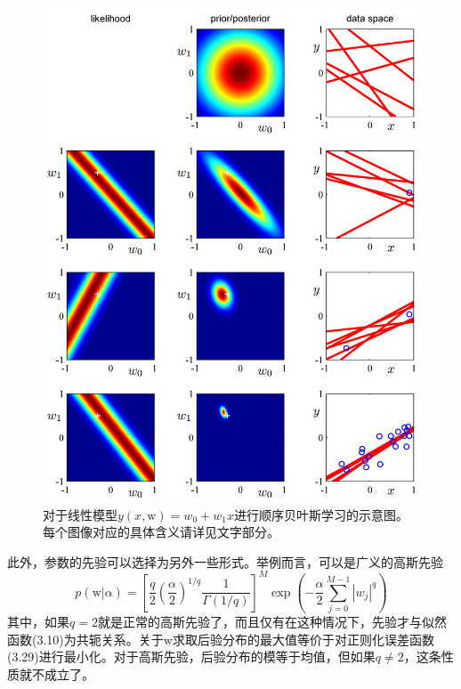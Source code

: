 \documentclass[b5paper]{book}
\numberwithin{equation}{chapter}
\newcommand {\bw} {\boldsymbol{\mathrm{w}}}
\begin{document}
{	\begin{figure}[H]
		\centering
		\includegraphics[scale=0.8]{Images/3-7.png}
		\caption{对于线性模型$y(x,\bw)=w_0+w_1 x$进行顺序贝叶斯学习的示意图。每个图像对应的具体含义请详见文字部分。}
		\label{fig:3-7}
	\end{figure}
	\indent 此外，参数的先验可以选择为另外一些形式。举例而言，可以是广义的高斯先验
	\begin{equation}
		p(\bw|\alpha) = \left[\frac{q}{2}\left(\frac{\alpha}{2}\right)^{1/q}\frac{1}{\Gamma(1/q)}\right]^M \exp \left(-\frac{\alpha}{2}\sum_{j=0}^{M-1} |w_j|^q\right)
	\end{equation}
	其中，如果$q=2$就是正常的高斯先验了，而且仅有在这种情况下，先验才与似然函数(3.10)为共轭关系。关于$\bw$求取后验分布的最大值等价于对正则化误差函数(3.29)进行最小化。对于高斯先验，后验分布的模等于均值，但如果$q \ne 2$，这条性质就不成立了。
	}
\end{document}
